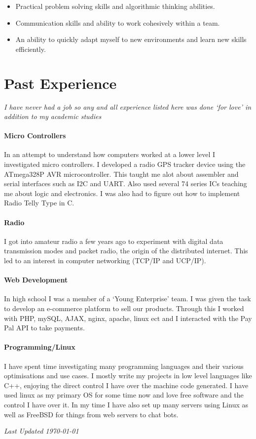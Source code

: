\documentclass[10pt,a4paper]{article}
\begin{document}
\begin{multicols*}{2}
\begin{itemize}
\item Practical problem solving skills and algorithmic thinking abilities.

\item Communication skills and ability to work cohesively within a team.

\item An ability to quickly adapt myself to new environments and learn new skills efficiently.
\end{itemize}

\section*{Past Experience}
\textit{I have never had a job so any and all experience listed here was done `for love' in addition to my academic studies}

\paragraph{Micro Controllers} In an attempt to understand how computers worked at a lower level I investigated micro controllers.
I developed a radio GPS tracker device using the ATmega328P AVR microcontroller.
This taught me alot about assembler and serial interfaces such as I2C and UART.
Also used several 74 series ICs teaching me about logic and electronics.
I was also had to figure out how to implement Radio Telly Type in C.

\paragraph{Radio} I got into amateur radio a few years ago to experiment with digital data transmission modes and packet radio, the origin of the distributed internet.
This led to an interest in computer networking (TCP/IP and UCP/IP).

\paragraph{Web Development} In high school I was a member of a `Young Enterprise' team.
I was given the task to develop an e-commerce platform to sell our products.
Through this I worked with PHP, mySQL, AJAX, nginx, apache, linux ect
and I interacted with the Pay Pal API to take payments.

\paragraph{Programming/Linux} I have spent time investigating many programming languages and their various optimisations and use cases.
I mostly write my projects in low level languages like C++, enjoying the direct control I have over the machine code generated.
I have used linux as my primary OS for some time now and love free software and the control I have over it.
In my time I have also set up many servers using Linux as well as FreeBSD for things from web servers to chat bots.

\vfill
\textit{Last Updated \today}
\end{multicols*}
\end{document}
